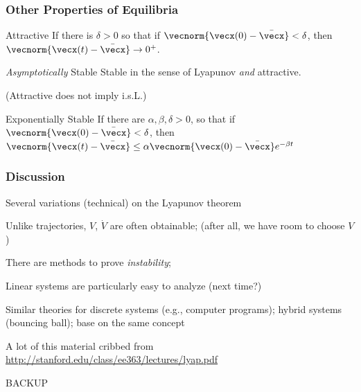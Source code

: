 \documentclass[12pt]{beamer}
\begin{document}
\begin{frame}
\frametitle{Other Properties of Equilibria}

\begin{block}{Attractive}
If there is $\delta > 0$ so that if $\vecnorm{\vecx(0)-\bar\vecx} < \delta$, then
$\vecnorm{\vecx(t)-\bar{\vecx}} \to 0^+$.
\end{block}

\begin{block}{\emph{Asymptotically} Stable}
Stable in the sense of Lyapunov \emph{and} attractive.

(Attractive does not imply i.s.L.)
\end{block}

\begin{block}{Exponentially Stable}
If there are $\alpha, \beta, \delta >0$, so that if
$\vecnorm{\vecx(0)-\bar{\vecx}} < \delta$, then
$\vecnorm{\vecx(t)-\bar\vecx}
	\leq \alpha \vecnorm{\vecx(0)-\bar\vecx} e^{-\beta t}$
\end{block}

\end{frame}




\begin{frame}
\frametitle{Discussion}

\begin{itemize}

\vitem Several variations (technical) on the Lyapunov theorem

\vitem
Unlike trajectories, $V$, $\dot V$ are often obtainable;
(after all, we have room to choose $V$)

\vitem
There are methods to prove \emph{instability};

\vitem
Linear systems are particularly easy to analyze (next time?)

\vitem
Similar theories for discrete systems (e.g., computer programs);
hybrid systems (bouncing ball); base on the same concept

\vitem A lot of this material cribbed from
\url{http://stanford.edu/class/ee363/lectures/lyap.pdf}

\end{itemize}

\end{frame}







\begin{frame}
BACKUP
\end{frame}
\end{document}

